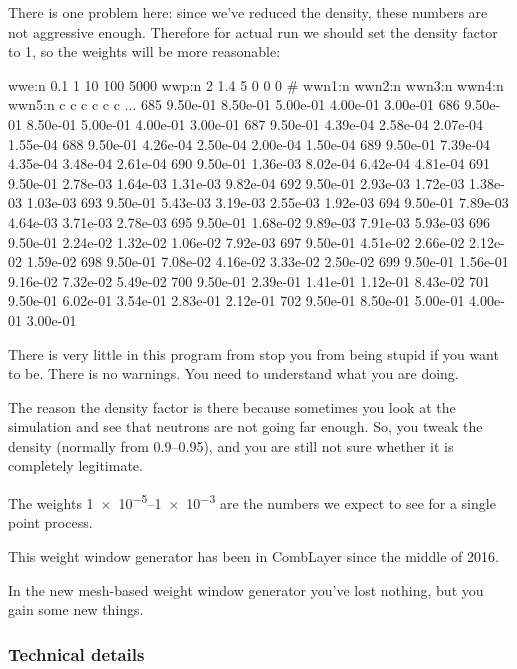 \begin{description}
There is one problem here: since we've reduced the density, these numbers are not aggressive enough.
Therefore for actual run we should set the density factor to 1, so the weights will be more reasonable:
\begin{deck}
wwe:n 0.1 1 10 100 5000
wwp:n 2 1.4 5 0 0 0
#   wwn1:n  wwn2:n  wwn3:n  wwn4:n  wwn5:n
c   c        c        c        c        c
...
685   9.50e-01 8.50e-01 5.00e-01 4.00e-01 3.00e-01
686   9.50e-01 8.50e-01 5.00e-01 4.00e-01 3.00e-01
687   9.50e-01 4.39e-04 2.58e-04 2.07e-04 1.55e-04
688   9.50e-01 4.26e-04 2.50e-04 2.00e-04 1.50e-04
689   9.50e-01 7.39e-04 4.35e-04 3.48e-04 2.61e-04
690   9.50e-01 1.36e-03 8.02e-04 6.42e-04 4.81e-04
691   9.50e-01 2.78e-03 1.64e-03 1.31e-03 9.82e-04
692   9.50e-01 2.93e-03 1.72e-03 1.38e-03 1.03e-03
693   9.50e-01 5.43e-03 3.19e-03 2.55e-03 1.92e-03
694   9.50e-01 7.89e-03 4.64e-03 3.71e-03 2.78e-03
695   9.50e-01 1.68e-02 9.89e-03 7.91e-03 5.93e-03
696   9.50e-01 2.24e-02 1.32e-02 1.06e-02 7.92e-03
697   9.50e-01 4.51e-02 2.66e-02 2.12e-02 1.59e-02
698   9.50e-01 7.08e-02 4.16e-02 3.33e-02 2.50e-02
699   9.50e-01 1.56e-01 9.16e-02 7.32e-02 5.49e-02
700   9.50e-01 2.39e-01 1.41e-01 1.12e-01 8.43e-02
701   9.50e-01 6.02e-01 3.54e-01 2.83e-01 2.12e-01
702   9.50e-01 8.50e-01 5.00e-01 4.00e-01 3.00e-01
\end{deck}

There is very little in this program from stop you from being stupid if you want to be.
There is no warnings. You need to understand what you are doing.

The reason the density factor is there because sometimes you look at the simulation and see that neutrons are not going far enough.
So, you tweak the density (normally from \numrange{0.9}{0.95}), and you are still not sure whether it is completely legitimate.

The weights \numrange[retain-unity-mantissa=false, range-phrase=\ --\ ]{1e-5}{1e-3} are the numbers we expect to see for a single point process.

This weight window generator has been in CombLayer since the middle of 2016.

\bigskip

In the new mesh-based weight window generator you've lost nothing, but you gain some new things.


\subsubsection{Technical details}


\end{description}
